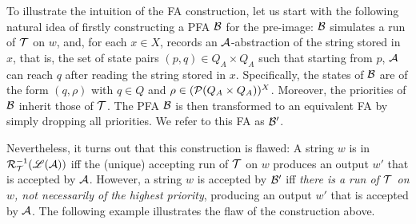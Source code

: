 To illustrate the intuition of the FA construction, let us start with the following natural idea of firstly constructing a PFA $\mathcal{B}$ for the pre-image: $\mathcal{B}$ simulates a run of $\mathcal{T}$ on $w$, and, for each $x \in X$, records an $\mathcal{A}$-abstraction of the string stored in $x$, that is, the set of state pairs $(p, q) \in Q_A \times Q_A$ such that starting from $p$, $\mathcal{A}$ can reach $q$ after reading the string stored in $x$. Specifically, the states of $\mathcal{B}$ are of the form $(q, \rho)$ with $q \in Q$ and $\rho \in (\mathcal{P}(Q_A \times Q_A ))^{X}$. Moreover, the priorities of $\mathcal{B}$ inherit those of $\mathcal{T}$. The PFA $\mathcal{B}$ is then transformed to an equivalent FA by simply dropping all priorities. We refer to this FA as $\mathcal{B}'$.

Nevertheless, it turns out that this construction is flawed: A string $w$ is in $\mathcal{R}^{-1}_{\mathcal{T}}(\mathscr{L}(\mathcal{A}))$ iff the (unique) accepting run of $\mathcal{T}$ on $w$ produces an output $w'$ that is accepted by $\mathcal{A}$. However, a string $w$ is accepted by $\mathcal{B}'$ iff \emph{there is a run of $\mathcal{T}$ on $w$, not necessarily of the highest priority}, producing an output $w'$ that is accepted by $\mathcal{A}$. The following example illustrates the flaw of the construction above.

